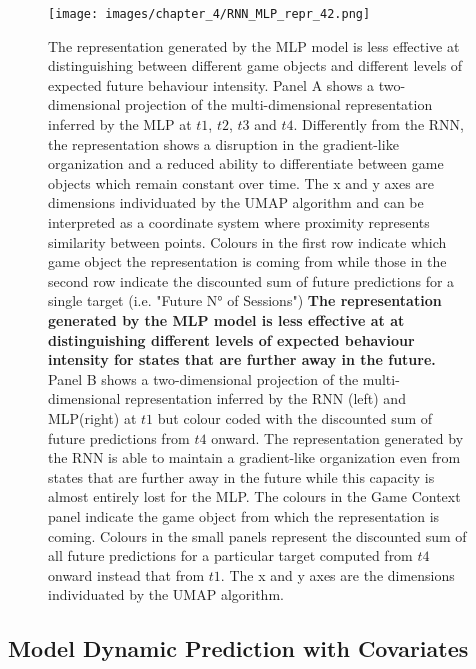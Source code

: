 \begin{figure}[ht]
\centering
\texttt{[image: images/chapter\_4/RNN\_MLP\_repr\_42.png]}
\caption[\textbf{Lower dimensional representation of the latent states generated by the time-distributed MLP architecture}]{The representation generated by the MLP model is less effective at distinguishing between different game objects and different levels of expected future behaviour intensity. Panel A shows a two-dimensional projection of the multi-dimensional representation inferred by the MLP at $t1$, $t2$, $t3$ and $t4$. Differently from the RNN, the representation shows a disruption in the gradient-like organization and a reduced ability to differentiate between game objects which remain constant over time. The x and y axes are dimensions individuated by the UMAP algorithm and can be interpreted as a coordinate system where proximity represents similarity between points. Colours in the first row indicate which game object the representation is coming from while those in the second row indicate the discounted sum of future predictions for a single target (i.e. "Future N° of Sessions") \textbf{The representation generated by the MLP model is less effective at at distinguishing different levels of expected behaviour intensity for states that are further away in the future.} Panel B shows a two-dimensional projection of the multi-dimensional representation inferred by the RNN (left) and MLP(right) at $t1$ but colour coded with the discounted sum of future predictions from $t4$ onward. The representation generated by the RNN is able to maintain a gradient-like organization even from states that are further away in the future while this capacity is almost entirely lost for the MLP. The colours in the Game Context panel indicate the game object from which the representation is coming. Colours in the small panels represent the discounted sum of all future predictions for a particular target computed from $t4$ onward instead that from $t1$. The x and y axes are the dimensions individuated by the UMAP algorithm.}
\label{predictive_panel}
\end{figure}

\subsection{Model Dynamic Prediction with Covariates}
\lorem

